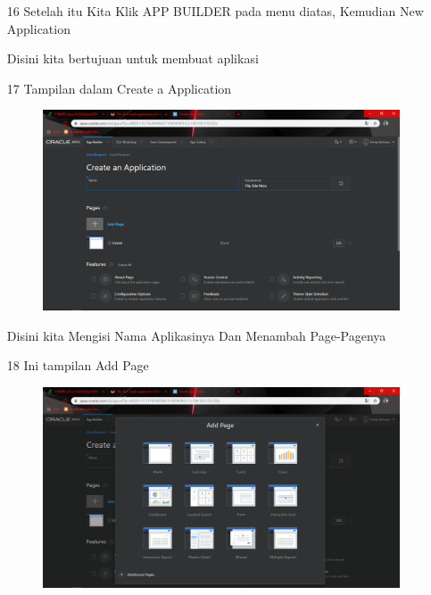 \begin{enumerate}
\item[16]Setelah itu Kita Klik APP BUILDER pada menu diatas, Kemudian New Application
    
\par
Disini kita bertujuan untuk membuat aplikasi

\item[17]Tampilan dalam Create a Application

\begin{figure}[!htbp]
    \begin{center}
    \includegraphics[scale=0.3]{figures/41.png}
    \end{center}   
    \end{figure}
    
\par
Disini kita Mengisi Nama Aplikasinya Dan Menambah Page-Pagenya

\item[18]Ini tampilan Add Page

\begin{figure}[!htbp]
    \begin{center}
    \includegraphics[scale=0.3]{figures/42.png}
    \end{center}   
    \end{figure}
    

\end{enumerate}
